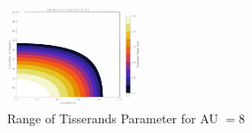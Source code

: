 \begin{figure}
    \centering
    \includegraphics[width=4cm]{Tisserands-removebg-preview.png}
    \caption{Range of Tisserands Parameter for AU $= 8$}
    \label{fig:enter-label}
\end{figure}